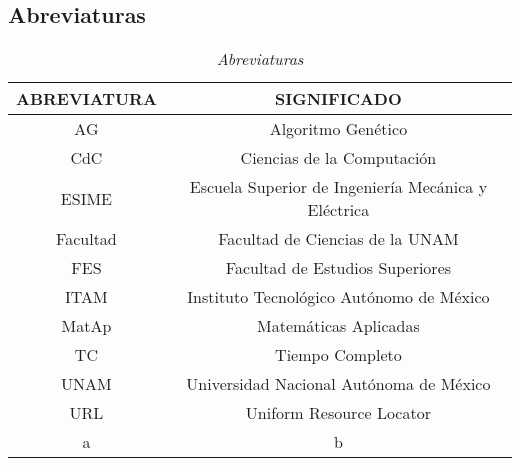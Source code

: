 \begin{appendices}
\chapter{Abreviaturas} %

\begin{table}[H]
\centering
\begin{tabular}{|c|c|}
\hline 
 ABREVIATURA & SIGNIFICADO \\ 
\hline 
 AG & Algoritmo Genético \\ 
\hline 
 CdC & Ciencias de la Computación \\ 
\hline 
 ESIME & Escuela Superior de Ingeniería Mecánica y Eléctrica\\ 
\hline 
 Facultad & Facultad de Ciencias de la UNAM \\ 
\hline 
 FES & Facultad de Estudios Superiores \\
\hline 
 ITAM & Instituto Tecnológico Autónomo de México \\ 
\hline 
 MatAp & Matemáticas Aplicadas \\ 
\hline 
 TC & Tiempo Completo \\ 
\hline 
 UNAM & Universidad Nacional Autónoma de México \\ 
\hline 
 URL & Uniform Resource Locator \\ 
\hline 
 a & b \\ 
\hline 
\end{tabular} 
\caption{\textit{Abreviaturas}}
\end{table}
\end{appendices}






